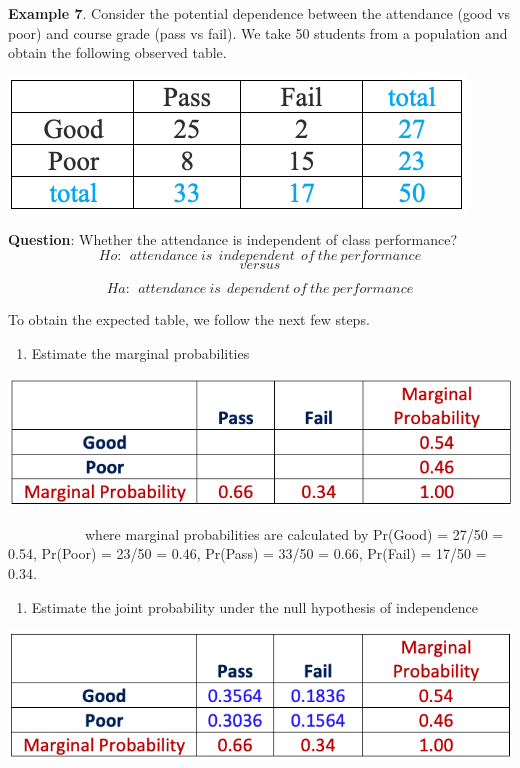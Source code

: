 \documentclass[
]{article}
\providecommand{\tightlist}{%
  \setlength{\itemsep}{0pt}\setlength{\parskip}{0pt}}
\begin{document}
\textbf{Example 7}. Consider the potential dependence between the
attendance (good vs poor) and course grade (pass vs fail). We take 50
students from a population and obtain the following observed table.

\begin{center}\includegraphics[width=0.35\linewidth]{week13/attendancePassFail} \end{center}

\textbf{Question}: Whether the attendance is independent of class
performance? \[
Ho: \ \ attendance \ is \ \ independent \ \ of \ the \ performance
\] \[versus\]

\[
Ha: \ \ attendance \ is  \ \ dependent \ of \ the \ performance
\]

To obtain the expected table, we follow the next few steps.

\begin{enumerate}
\def\labelenumi{\arabic{enumi}.}
\tightlist
\item
  Estimate the marginal probabilities
\end{enumerate}

\begin{center}\includegraphics[width=0.5\linewidth]{week13/marginalTable} \end{center}

~~~~~~~~~~~where marginal probabilities are calculated by Pr(Good) =
27/50 = 0.54, Pr(Poor) = 23/50 = 0.46, Pr(Pass) = 33/50 = 0.66, Pr(Fail)
= 17/50 = 0.34.

\begin{enumerate}
\def\labelenumi{\arabic{enumi}.}
\setcounter{enumi}{1}
\tightlist
\item
  Estimate the joint probability under the null hypothesis of
  independence
\end{enumerate}

\begin{center}\includegraphics[width=0.5\linewidth]{week13/jointProb} \end{center}
\end{document}
